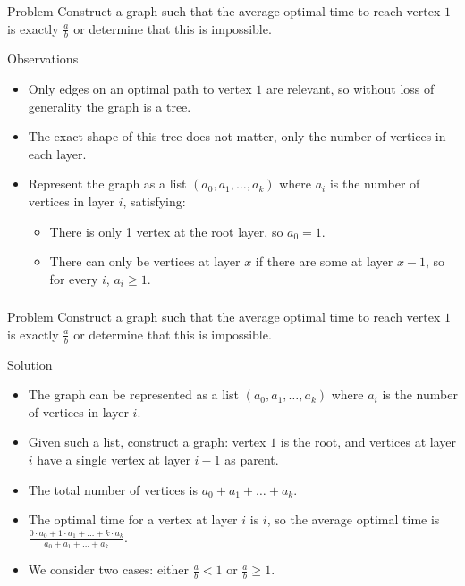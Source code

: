\begin{frame}
    \frametitle{\problemtitle}
    \begin{block}{Problem}
        Construct a graph such that the average optimal time to reach vertex $1$
        is exactly $\displaystyle\frac{a}{b}$ or determine that this is impossible.
    \end{block}
    \pause
    \begin{block}{Observations}
        \begin{itemize}
            \item<+-> Only edges on an optimal path to vertex $1$ are relevant, so without loss of generality the graph is a tree.
            \item<+-> The exact shape of this tree does not matter, only the number of vertices in each layer.
            \item<+-> Represent the graph as a list
                $(a_0, a_1, \ldots, a_k)$ where $a_i$ is the number of vertices
                in layer $i$\pause, satisfying:
                \begin{itemize}
                    \item There is only 1 vertex at the root layer, so $a_0 = 1$.
                    \item There can only be vertices at layer $x$ if there are some at layer $x-1$, so for every $i$, $a_i \geq 1$.
                \end{itemize}
        \end{itemize}
    \end{block}
\end{frame}
\begin{frame}
    \frametitle{\problemtitle}
    \begin{block}{Problem}
        Construct a graph such that the average optimal time to reach vertex $1$
        is exactly $\displaystyle\frac{a}{b}$ or determine that this is impossible.
    \end{block}
    \begin{block}{Solution}
        \begin{itemize}
            \item<+-> The graph can be represented as a list $(a_0, a_1, \ldots, a_k)$ where $a_i$ is the number of vertices in layer $i$.
            \item<+-> Given such a list, construct a graph: vertex $1$ is the
            root, and vertices at layer $i$ have a single vertex at layer $i-1$ as parent.
            \item<+-> The total number of vertices is $a_0 + a_1 + \ldots + a_k$.
            \item<+-> The optimal time for a vertex at layer $i$ is $i$, so the average optimal time is $\frac{0\cdot a_0 + 1 \cdot a_1 + \ldots + k \cdot a_k}{a_0 + a_1 + \ldots + a_k}$.
            \item<+-> We consider two cases: either $\frac{a}{b} < 1$ or $\frac{a}{b} \geq 1$.
        \end{itemize}
    \end{block}
\end{frame}

